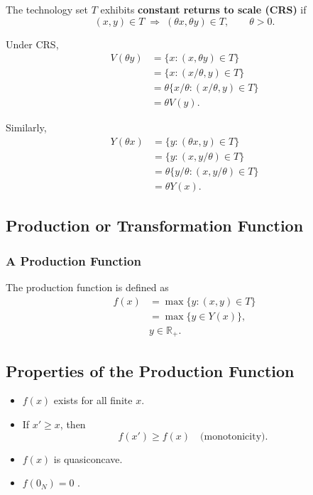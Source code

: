 The technology set $T$ exhibits \textbf{constant returns to scale (CRS)} if
\[
(x,y) \in T \;\Rightarrow\; (\theta x,\theta y) \in T,
\qquad \theta > 0.
\]

\medskip

Under CRS,
\[
\begin{aligned}
V(\theta y)
&=
\{x : (x,\theta y)\in T\}\\
&=
\{x : (x/\theta, y)\in T\}\\
&=
\theta \{x/\theta : (x/\theta,y)\in T\}\\
&=
\theta V(y).
\end{aligned}\]

Similarly,
\[
\begin{aligned}
Y(\theta x)
&=
\{y : (\theta x,y)\in T\}\\
&=
\{y : (x, y/\theta)\in T\}\\
&=
\theta \{y/\theta : (x,y/\theta)\in T\}\\
&=
\theta Y(x).
\end{aligned}\]

\subsection{Production or Transformation Function}

\subsubsection{A Production Function}

The production function is defined as
\[
\begin{aligned}
f(x)
&=
\max \{y : (x,y)\in T\}\\
&=
\max \{y \in Y(x)\},\\
&y \in \mathbb{R}_+.
\end{aligned}
\]

\subsection*{Properties of the Production Function}

\begin{itemize}
    \item[f.1] $f(x)$ exists for all finite $x$.
    
    \item[f.2] If $x' \ge x$, then
    \[
    f(x') \ge f(x)
    \quad \text{(monotonicity)}.
    \]
    
    \item[f.3] $f(x)$ is quasiconcave.
    
    \item[f.4] $f(0_N)=0$
    \quad {}.
\end{itemize}

